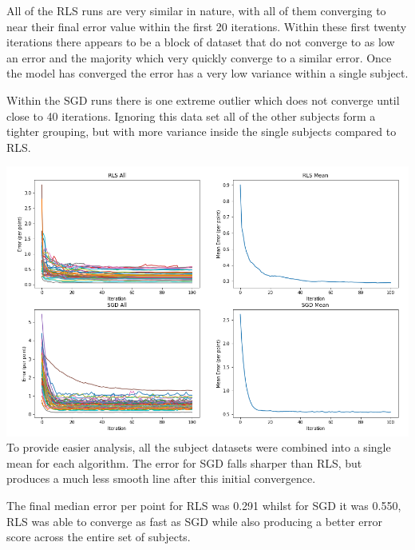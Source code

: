 All of the RLS runs are very similar in nature, with all of them converging to near their final error value within the first 20 iterations. Within these first twenty iterations there appears to be a block of dataset that do not converge to as low an error and the majority which very quickly converge to a similar error. Once the model has converged the error has a very low variance within a single subject.

Within the SGD runs there is one extreme outlier which does not converge until close to 40 iterations. Ignoring this data set all of the other subjects form a tighter grouping, but with more variance inside the single subjects compared to RLS. 

\includegraphics[width=\linewidth]{figs/ParkinsonsALL.png}
To provide easier analysis, all the subject datasets were combined into a single mean for each algorithm. 
The error for SGD falls sharper than RLS, but produces a much less smooth line after this initial convergence. 

The final median error per point for RLS was 0.291 whilst for SGD it was 0.550, RLS was able to converge as fast as SGD while also producing a better error score across the entire set of subjects.